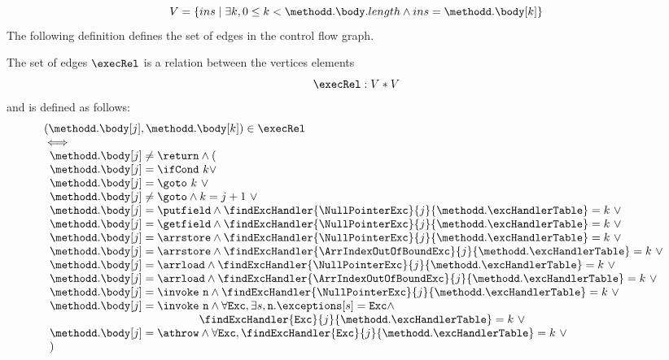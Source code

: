 $$ V = \{ ins \mid \exists k,  0 \leq k < \methodd.\body.length \wedge ins = \methodd.\body[k] \}$$
The following definition defines the set of edges in the control flow graph.
\begin{defEdge}\label{defEdge} 
 The set of edges $\execRel$ is a relation between the vertices elements
$$ \execRel : V * V $$ and is defined  as follows:
$$ \begin{array}{l} (\methodd.\body[j], \methodd.\body[k]) \in \execRel \\
   \iff \\
   \begin{array}{l} \methodd.\body[j] \neq \return \wedge( \\
                    \methodd.\body[j] = \ifCond \ k \vee \\
		    \methodd.\body[j] = \goto \ k \ \vee \\
		    \methodd.\body[j] \neq \goto \wedge  k = j+1 \ \vee \\ 
		    \methodd.\body[j] = \putfield \wedge \findExcHandler{ \NullPointerExc}{j}{\methodd.\excHandlerTable} = k \ \vee \\
		    \methodd.\body[j] = \getfield \wedge \findExcHandler{ \NullPointerExc}{j}{\methodd.\excHandlerTable} = k \ \vee \\
		    \methodd.\body[j] = \arrstore \wedge \findExcHandler{ \NullPointerExc}{j}{\methodd.\excHandlerTable} = k \ \vee \\
                    \methodd.\body[j] = \arrstore \wedge \findExcHandler{\ArrIndexOutOfBoundExc  }{j}{\methodd.\excHandlerTable} = k \ \vee \\
		    
		    \methodd.\body[j] = \arrload \wedge \findExcHandler{ \NullPointerExc}{j}{\methodd.\excHandlerTable} = k \ \vee \\
                    \methodd.\body[j] = \arrload \wedge \findExcHandler{\ArrIndexOutOfBoundExc  }{j}{\methodd.\excHandlerTable} = k \ \vee \\
		    \methodd.\body[j] = \invoke \ \mbox{\rm \texttt{n}} \wedge \findExcHandler{\NullPointerExc }{j}{\methodd.\excHandlerTable} = k \ \vee \\
		     \methodd.\body[j] = \invoke \ \mbox{\rm \texttt{n}} \wedge \forall \mbox{\rm\texttt{Exc}}, \exists s , \mbox{\rm \texttt{n}}.\exceptions[s ] = \mbox{\rm\texttt{Exc}} \wedge  \\
	\phantom{\methodd.\body[j] = \invoke } \findExcHandler{\mbox{\rm\texttt{Exc}} }{j}{\methodd.\excHandlerTable} = k \ \vee \\	    
		    \methodd.\body[j] = \athrow  \wedge \forall \mbox{\rm\texttt{Exc}}, \findExcHandler{\mbox{\rm\texttt{Exc}} }{j}{\methodd.\excHandlerTable} = k \ \vee \\
		    
		    )
   \end{array} 
\end{array}$$
\end{defEdge}
